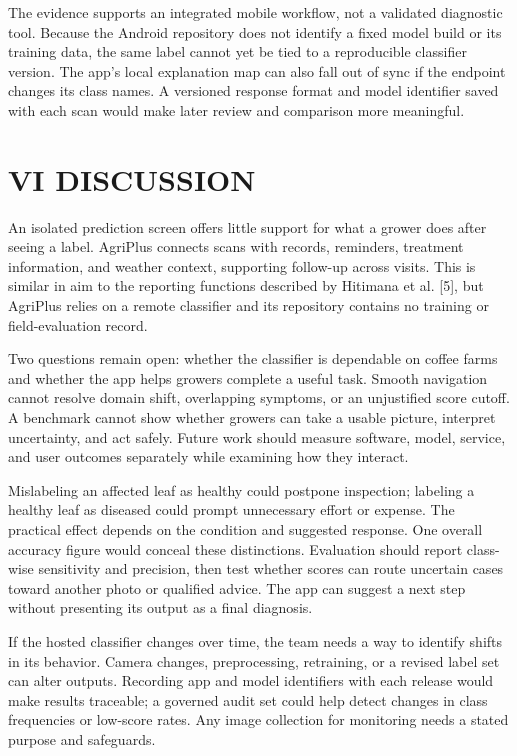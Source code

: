 \documentclass[conference]{IEEEtran}
\begin{document}
The evidence supports an integrated mobile workflow, not a validated diagnostic tool. Because the Android repository does not identify a fixed model build or its training data, the same label cannot yet be tied to a reproducible classifier version. The app's local explanation map can also fall out of sync if the endpoint changes its class names. A versioned response format and model identifier saved with each scan would make later review and comparison more meaningful.

\section*{VI DISCUSSION}

An isolated prediction screen offers little support for what a grower does after seeing a label. AgriPlus connects scans with records, reminders, treatment information, and weather context, supporting follow-up across visits. This is similar in aim to the reporting functions described by Hitimana et al. [5], but AgriPlus relies on a remote classifier and its repository contains no training or field-evaluation record.

Two questions remain open: whether the classifier is dependable on coffee farms and whether the app helps growers complete a useful task. Smooth navigation cannot resolve domain shift, overlapping symptoms, or an unjustified score cutoff. A benchmark cannot show whether growers can take a usable picture, interpret uncertainty, and act safely. Future work should measure software, model, service, and user outcomes separately while examining how they interact.

Mislabeling an affected leaf as healthy could postpone inspection; labeling a healthy leaf as diseased could prompt unnecessary effort or expense. The practical effect depends on the condition and suggested response. One overall accuracy figure would conceal these distinctions. Evaluation should report class-wise sensitivity and precision, then test whether scores can route uncertain cases toward another photo or qualified advice. The app can suggest a next step without presenting its output as a final diagnosis.

If the hosted classifier changes over time, the team needs a way to identify shifts in its behavior. Camera changes, preprocessing, retraining, or a revised label set can alter outputs. Recording app and model identifiers with each release would make results traceable; a governed audit set could help detect changes in class frequencies or low-score rates. Any image collection for monitoring needs a stated purpose and safeguards.
\end{document}
